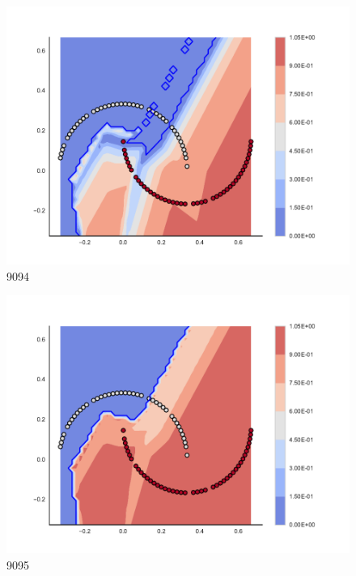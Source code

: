 \begin{subfigure}[b]{0.09\textwidth}
    \includegraphics[clip, trim=2.35cm 1.75cm 4.5cm 0cm,width=\textwidth]{img/convergence/9094.pdf}
    \caption{9094}
    \label{fig:convergence_9094}
\end{subfigure}
%
\begin{subfigure}[b]{0.09\textwidth}
    \includegraphics[clip, trim=2.35cm 1.75cm 4.5cm 0cm,width=\textwidth]{img/convergence/9095.pdf}
    \caption{9095}
    \label{fig:convergence_9095}
\end{subfigure}
%
